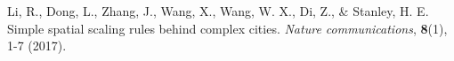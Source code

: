 \documentclass[aps,preprint]{revtex4-1}
\begin{document}
\begin{thebibliography}{prsty}

%
%
%
%
%
%
%
%
%
%
%
%
%
%
%
%
%
%
%
%
%
%
%
%
%
%
%
%
%
%
 Li, R., Dong, L., Zhang, J., Wang, X., Wang, W. X., Di, Z., \& Stanley, H. E.  Simple spatial scaling rules behind complex cities. {\it Nature communications}, {\bf 8}(1), 1-7 (2017).

\end{thebibliography}
\end{document}
